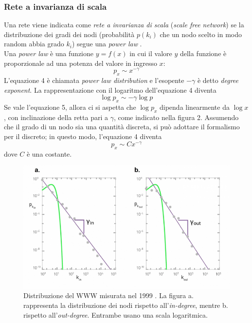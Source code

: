 \documentclass[a4paper,12pt]{article}
\begin{document}
\subsubsection{Rete a invarianza di scala}
Una rete viene indicata come \textit{rete a invarianza di scala} (\textit{scale free network}) se la distribuzione dei gradi dei nodi (probabilità $p(k_i)$ che un nodo scelto in modo random abbia grado $k_i$) segue una \textit{power law} \cite{scalefree}.\\
Una \textit{power law} \cite{barabasi} è una funzione $y=f(x)$ in cui il valore $y$ della funzione è proporzionale ad una potenza del valore in ingresso $x$:
\begin{equation}
p_x \sim x^{-\gamma}
\end{equation}
L'equazione 4 è chiamata \textit{power law distribution} e l'esopente $-\gamma$ è detto \textit{degree exponent}. La rappresentazione con il logaritmo dell'equazione 4 diventa
\begin{equation}
\log p_x \sim -\gamma \log p
\end{equation}
Se vale l'equazione 5, allora ci si aspetta che $\log p_x$ dipenda linearmente da $\log x$, con inclinazione della retta pari a $\gamma$, come indicato nella figura 2. Assumendo che il grado di un nodo sia una quantità discreta, si può adottare il formalismo per il discreto; in questo modo, l'equazione 4 diventa
\begin{equation}
p_x \sim Cx^{-\gamma}
\end{equation} 
dove $C$ è una costante.
\begin{figure}[h]
\centering
\includegraphics[scale=0.6]{images/powerlaw.png}
\caption{Distribuzione del WWW misurata nel 1999 \cite{barabasi}. La figura a. rappresenta la distribuzione dei nodi rispetto all'\textit{in-degree}, mentre b. rispetto all'\textit{out-degree}. Entrambe usano una scala logaritmica.}
\end{figure}
\end{document}
